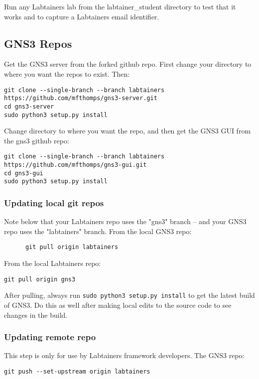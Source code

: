 \documentclass[12pt]{article}
\begin{document}
\vspace{5mm}

\noindent
Run any Labtainers lab from the labtainer_student directory to test that it works and to capture a Labtainers email identifier.

\subsection{GNS3 Repos}
Get the GNS3 server from the forked github repo.  First change your directory to where you want the repos to
exist.  Then:
\small
\begin{verbatim}
git clone --single-branch --branch labtainers https://github.com/mfthomps/gns3-server.git
cd gns3-server
sudo python3 setup.py install
\end{verbatim}

Change directory to where you want the repo, and then get the GNS3 GUI from the gns3 github repo:
\small
\begin{verbatim}
git clone --single-branch --branch labtainers  https://github.com/mfthomps/gns3-gui.git
cd gns3-gui
sudo python3 setup.py install
\end{verbatim}
\normalsize


\subsubsection{Updating local git repos}
Note below that your Labtainers repo uses the "gns3" branch -- and your GNS3 repo uses the "labtainers" branch.
From the local GNS3  repo:
\begin{verbatim}
      git pull origin labtainers
\end{verbatim}

From the local Labtainers repo:
\begin{verbatim}
git pull origin gns3
\end{verbatim}

After pulling, always run {\tt sudo python3 setup.py install} to get the latest 
build of GNS3. Do this as well after making local edits to the source code to see changes in the build.

\subsubsection{Updating remote repo}
This step is only for use by Labtainers framework developers.
The GNS3 repo:
\begin{verbatim}
git push --set-upstream origin labtainers
\end{verbatim}
\end{document}
